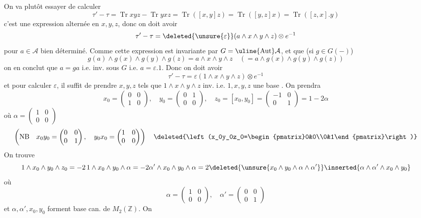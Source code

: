 On va plutôt essayer de calculer
\[
\tau'-\tau=\operatorname{Tr}xyz-\operatorname{Tr}yxz
=\operatorname{Tr}([x,y]z)=\operatorname{Tr}([y,z]x)=\operatorname{Tr}([z,x].y)
\]
c'est une expression  alternée en $x,y,z$, donc on doit avoir
\[
\tau'-\tau=\deleted{\unsure{\varepsilon}}(a\wedge x\wedge y\wedge z)\otimes e^{-1}
\]
pour $a\in\mathcal{A}$ bien déterminé. Comme cette expression est invariante par $G=\uline{\operatorname{Aut}}\mathcal{A}$,  et que (si $g\in G(-)$)
\[
g(a)\wedge g(x)\wedge g(y)\wedge g(z)=a\wedge x\wedge y\wedge z\quad(=a\wedge g(x)\wedge g(y)\wedge g(z))
\]
on en conclut que $a=ga$ i.e. inv. sous $G$ i.e. $a=\varepsilon.1$. Donc on doit avoir
\[
\tau'-\tau=\varepsilon(1\wedge x\wedge y\wedge z)\otimes e^{-1}
\]
et pour calculer $\varepsilon$, il suffit de prendre $x,y,z$ tels que $1\wedge x\wedge y\wedge z$ inv. i.e. $1,x,y,z$ une base . On prendra
\[
x_0=\begin{pmatrix}0&0\\1&0\end{pmatrix},\quad
y_0=\begin{pmatrix}0&1\\0&0\end{pmatrix},\quad
z_0=[x_0,y_0]=\begin{pmatrix}-1&0\\0&1\end{pmatrix}=1-2\alpha
\]
où $\alpha=\begin{pmatrix}1&0\\0&0\end{pmatrix}$
\[
\left(\mathrm{NB}\quad x_0y_0=\begin{pmatrix}0&0\\0&1\end{pmatrix},\quad y_0x_0=\begin{pmatrix}1&0\\0&0\end{pmatrix}\right)
\quad\deleted{\left(x_0y_0z_0=\begin{pmatrix}0&0\\0&1\end{pmatrix}\right)}
\]
On trouve
\[
1\wedge x_0\wedge y_0\wedge z_0=-2\,1\wedge x_0\wedge y_0\wedge\alpha
=-2\alpha'\wedge x_0\wedge y_0\wedge\alpha
=2\deleted{\unsure{x_0\wedge y_0\wedge\alpha\wedge\alpha'}}\inserted{\alpha\wedge\alpha'\wedge x_0\wedge y_0}
\]
où
\[
\alpha=\begin{pmatrix}1&0\\0&0\end{pmatrix},\quad\alpha'=\begin{pmatrix}0&0\\0&1\end{pmatrix}
\]
et  $\alpha,\alpha',x_0,y_0$ forment base can. de $M_2(\mathbb{Z})$. On
